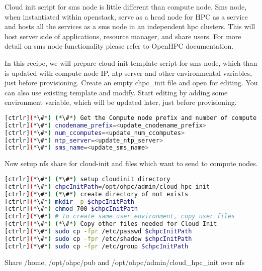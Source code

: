 Cloud init script for sms node is little different than compute node. Sms node, when instantiated within openstack, serve as a head node for HPC as a service and hosts all the services as a sms node in an independent hpc clusters. This will host server side of applications, resource manager, and share users. For more detail on sms node functionality please refer to OpenHPC documentation.

In this recipe, we will prepare cloud-init template script for sms node, which than is updated with compute node IP, ntp server and other environmental variables, just before provisioning. 
Create an empty chpc\_init file and open for editing. You can also use existing template and modify. Start editing by adding some environment variable, which will be updated later, just before provisioning.


\begin{lstlisting}[language=bash,keywords={}]
[ctrlr](*\#*) (*\#*) Get the Compute node prefix and number of compute nodes
[ctrlr](*\#*) cnodename_prefix=<update_cnodename_prefix>
[ctrlr](*\#*) num_ccomputes=<update_num_ccomputes>
[ctrlr](*\#*) ntp_server=<update_ntp_server>
[ctrlr](*\#*) sms_name=<update_sms_name>
\end{lstlisting}

Now setup nfs share for cloud-init and files which want to send to compute nodes.


\begin{lstlisting}[language=bash,keywords={}]
[ctrlr](*\#*) (*\#*) setup cloudinit directory
[ctrlr](*\#*) chpcInitPath=/opt/ohpc/admin/cloud_hpc_init
[ctrlr](*\#*) (*\#*) create directory of not exists
[ctrlr](*\#*) mkdir -p $chpcInitPath
[ctrlr](*\#*) chmod 700 $chpcInitPath
[ctrlr](*\#*) # To create same user environment, copy user files 
[ctrlr](*\#*) (*\#*) Copy other files needed for Cloud Init
[ctrlr](*\#*) sudo cp -fpr /etc/passwd $chpcInitPath
[ctrlr](*\#*) sudo cp -fpr /etc/shadow $chpcInitPath
[ctrlr](*\#*) sudo cp -fpr /etc/group $chpcInitPath
\end{lstlisting}

Share /home, /opt/ohpc/pub and /opt/ohpc/admin/cloud\_hpc\_init over nfs

